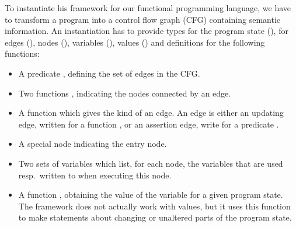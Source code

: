 \documentclass[a4paper,parskip=half,BCOR=8mm,DIV=calc,12pt]{scrbook}
\begin{document}
To instantiate his framework for our functional programming language, we have to transform a program into a control flow graph (CFG) containing semantic information. An instantiation has to provide types for the program state (), for edges (), nodes (), variables (), values () and definitions for the following functions:
\begin{itemize}
\item A predicate , defining the set of edges in the CFG. 
\item Two functions , indicating the nodes connected by an edge.
\item A function  which gives the kind of an edge. An edge is either an updating edge, written  for a function , or an assertion edge, write  for a predicate .
\item A special node  indicating the entry node.
\item Two sets of variables  which list, for each node, the variables that are used resp.\ written to when executing this node.
\item A function , obtaining the value of the variable for a given program state. The framework does not actually work with values, but it uses this function to make statements about changing or unaltered parts of the program state.
\end{itemize}
\end{document}
